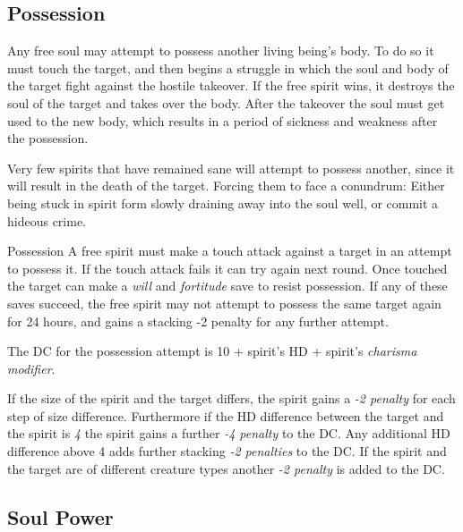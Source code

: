 \subsection{Possession}
\label{sec:Possession}

Any free soul may attempt to possess another living being's body. To do so 
it must touch the target, and then begins a struggle in which the soul and 
body of the target fight against the hostile takeover. If the free spirit 
wins, it destroys the soul of the target and takes over the body. After the 
takeover the soul must get used to the new body, which results in a period 
of sickness and weakness after the possession.

Very few spirits that have remained sane will attempt to possess another, since
it will result in the death of the target. Forcing them to face a conundrum:
Either being stuck in spirit form slowly draining away into the soul well,
or commit a hideous crime.


\begin{35e}{Possession}
  A free spirit must make a touch attack against a target in an attempt to
  possess it. If the touch attack fails it can try again next round. Once
  touched the target can make a \emph{will} and \emph{fortitude} save to
  resist possession. If any of these saves succeed, the free spirit may not
  attempt to possess the same target again for 24 hours, and gains a stacking
  -2 penalty for any further attempt.

  The DC for the possession attempt is 10 +  spirit's HD +
  spirit's \emph{charisma modifier}.

  If the size of the spirit and the target differs, the spirit gains a
  \emph{-2 penalty} for each step of size difference. Furthermore if the
  HD difference between the target and the spirit is \emph{4} the spirit gains
  a further \emph{-4 penalty} to the DC. Any additional HD difference above
  4 adds further stacking \emph{-2 penalties} to the DC. If the spirit and
  the target are of different creature types another \emph{-2 penalty} is
  added to the DC.
\end{35e}

\subsection{Soul Power}
\label{sec:Soul Power}

